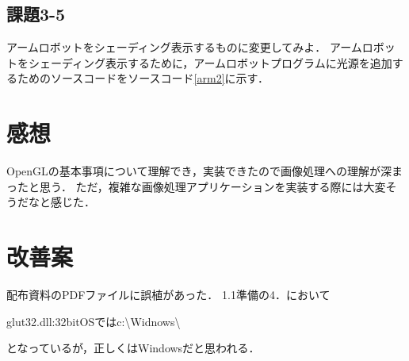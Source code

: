 \documentclass[twocolumn]{jsarticle}
\begin{document}


\subsection{課題3-5}
アームロボットをシェーディング表示するものに変更してみよ．
アームロボットをシェーディング表示するために，アームロボットプログラムに光源を追加するためのソースコードをソースコード\ref{arm2}に示す．



\section{感想}
OpenGLの基本事項について理解でき，実装できたので画像処理への理解が深まったと思う．
ただ，複雑な画像処理アプリケーションを実装する際には大変そうだなと感じた．
\section{改善案}
配布資料のPDFファイルに誤植があった．
1.1準備の4．において

glut32.dll:32bitOSではc:\textbackslash Widnows\textbackslash

となっているが，正しくはWindowsだと思われる．
\end{document}
